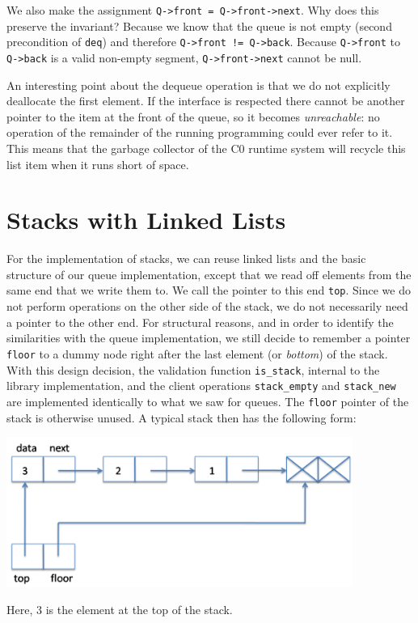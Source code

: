 We also make the assignment \lstinline'Q->front = Q->front->next'.  Why
does this preserve the invariant?  Because we know that the queue is
not empty (second precondition of \lstinline'deq') and therefore
\lstinline'Q->front != Q->back'.  Because \lstinline'Q->front' to \lstinline'Q->back'
is a valid non-empty segment, \lstinline'Q->front->next' cannot be null.

An interesting point about the dequeue operation is that we do not
explicitly deallocate the first element.  If the interface is
respected there cannot be another pointer to the item at the front of
the queue, so it becomes \emph{unreachable}: no operation of the
remainder of the running programming could ever refer to it.  This
means that the garbage collector of the C0 runtime system will recycle
this list item when it runs short of space.


\section{Stacks with Linked Lists}
\label{sec:linkedlist:stacks}

For the implementation of stacks, we can reuse linked lists and the
basic structure of our queue implementation, except that we read off
elements from the same end that we write them to. We call the pointer
to this end \lstinline'top'. Since we do not perform operations on the
other side of the stack, we do not necessarily need a pointer to the
other end.  For structural reasons, and in order to identify the
similarities with the queue implementation, we still decide to
remember a pointer \lstinline'floor' to a dummy node right after the
last element (or \emph{bottom}) of the stack.  With
this design decision, the validation function \lstinline'is_stack',
internal to the library implementation, and the client operations
\lstinline'stack_empty' and \lstinline'stack_new' are implemented
identically to what we saw for queues.  The \lstinline'floor' pointer
of the stack is otherwise unused.  A typical stack then has the
following form:
\begin{center}
\includegraphics[width=0.85\textwidth]{img/stack1.png}
\end{center}
Here, $3$ is the element at the top of the stack.

